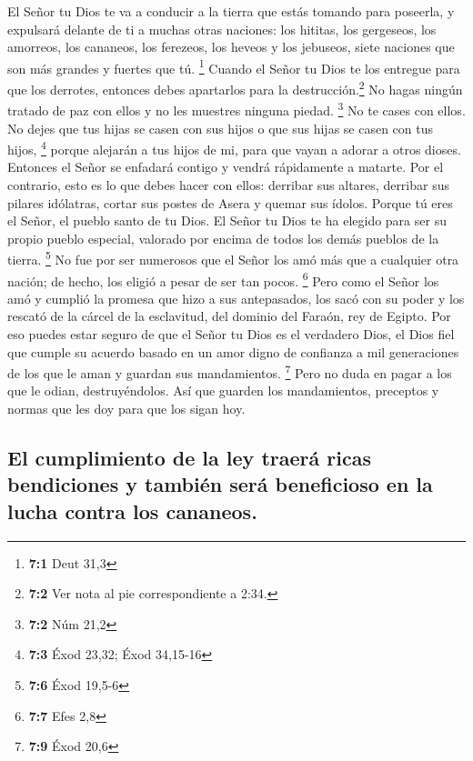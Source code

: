  El Señor tu Dios te va a conducir a la tierra que estás
tomando para poseerla, y expulsará delante de ti a muchas otras
naciones: los hititas, los gergeseos, los amorreos, los cananeos, los
ferezeos, los heveos y los jebuseos, siete naciones que son más grandes
y fuertes que tú. \footnote{\textbf{7:1} Deut 31,3} 
Cuando el Señor tu Dios te los entregue para que los derrotes, entonces
debes apartarlos para la destrucción.\footnote{\textbf{7:2} Ver nota al
  pie correspondiente a 2:34.} No hagas ningún tratado de paz con ellos
y no les muestres ninguna piedad. \footnote{\textbf{7:2} Núm 21,2}
 No te cases con ellos. No dejes que tus hijas se casen
con sus hijos o que sus hijas se casen con tus hijos, \footnote{\textbf{7:3}
  Éxod 23,32; Éxod 34,15-16}  porque alejarán a tus hijos
de mi, para que vayan a adorar a otros dioses. Entonces el Señor se
enfadará contigo y vendrá rápidamente a matarte.  Por el
contrario, esto es lo que debes hacer con ellos: derribar sus altares,
derribar sus pilares idólatras, cortar sus postes de Asera y quemar sus
ídolos.  Porque tú eres el Señor, el pueblo santo de tu
Dios. El Señor tu Dios te ha elegido para ser su propio pueblo especial,
valorado por encima de todos los demás pueblos de la tierra. \footnote{\textbf{7:6}
  Éxod 19,5-6}  No fue por ser numerosos que el Señor los
amó más que a cualquier otra nación; de hecho, los eligió a pesar de ser
tan pocos. \footnote{\textbf{7:7} Efes 2,8}  Pero como el
Señor los amó y cumplió la promesa que hizo a sus antepasados, los sacó
con su poder y los rescató de la cárcel de la esclavitud, del dominio
del Faraón, rey de Egipto.  Por eso puedes estar seguro de
que el Señor tu Dios es el verdadero Dios, el Dios fiel que cumple su
acuerdo basado en un amor digno de confianza a mil generaciones de los
que le aman y guardan sus mandamientos. \footnote{\textbf{7:9} Éxod 20,6}
 Pero no duda en pagar a los que le odian,
destruyéndolos.  Así que guarden los mandamientos,
preceptos y normas que les doy para que los sigan hoy.

\hypertarget{el-cumplimiento-de-la-ley-traeruxe1-ricas-bendiciones-y-tambiuxe9n-seruxe1-beneficioso-en-la-lucha-contra-los-cananeos.}{%
\subsection{El cumplimiento de la ley traerá ricas bendiciones y también
será beneficioso en la lucha contra los
cananeos.}\label{el-cumplimiento-de-la-ley-traeruxe1-ricas-bendiciones-y-tambiuxe9n-seruxe1-beneficioso-en-la-lucha-contra-los-cananeos.}}

